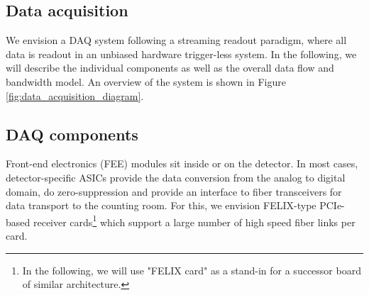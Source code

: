 
\subsection{Data acquisition}

We envision a DAQ system following a streaming readout paradigm, where all data is readout in an unbiased hardware trigger-less system. In the following, we will describe the individual components as well as the overall data flow and bandwidth model. An overview of the system is shown in Figure \ref{fig:data_acquisition_diagram}.


\begin{figure*}[th]
 \begin{center}
  
  
  \caption[Data Acquisition Diagram]{\label{fig:data_acquisition_diagram} The DAQ electronics deployment can be roughly divided by their location, with Front End Electronics (FEE) modules on/near the detector; Front End Processor boards (FEP) which digitize or reformat detector information and Stream Aggregator Boards (SAB), which bundle streams, in the hall; and online filtering and monitoring in the counting room. Long term storage and analysis processing is performed in a federated model on multiple sites. }
 \end{center}
\end{figure*}


\subsection{DAQ components}
 Front-end electronics (FEE) modules sit inside or on the detector. In most cases, detector-specific ASICs provide the data conversion from the analog to digital domain, do zero-suppression and provide an interface to fiber transceivers for data transport to the counting room.  For this, we envision FELIX-type PCIe-based receiver cards\footnote{In the following, we will use "FELIX card" as a stand-in for a successor board of similar architecture.} which support a large number of high speed fiber links per card.  

